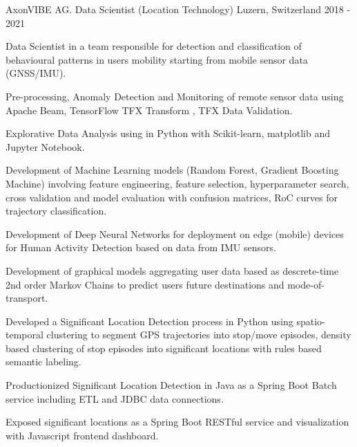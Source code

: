 

\begin{cventries}

  \cventry
    {AxonVIBE AG.} %
    {Data Scientist (Location Technology)} %
    {Luzern, Switzerland} %
    {2018 - 2021} %
    {
      \begin{cvitems} %
        \item {
            Data Scientist in a team responsible for detection and classification 
            of behavioural patterns in users mobility starting from mobile sensor data (GNSS/IMU).}
        \item {
            Pre-processing, Anomaly Detection and Monitoring of remote sensor data 
            using Apache Beam, TensorFlow TFX Transform , TFX Data Validation.}
        \item {
            Explorative Data Analysis using in Python with Scikit-learn, matplotlib and Jupyter Notebook.}
        \item {
            Development of Machine Learning models (Random Forest, Gradient 
            Boosting Machine) involving feature engineering, feature selection, hyperparameter search, cross validation 
            and model evaluation with confusion matrices, RoC curves for trajectory classification.}
        \item {
            Development of Deep Neural Networks for deployment on edge (mobile) devices for
            Human Activity Detection based on data from IMU sensors.}
        \item {
            Development of graphical models aggregating user data based as descrete-time
            2nd order Markov Chains to predict users future destinations and mode-of-transport.}
        \item {
            Developed a Significant Location Detection process in Python using spatio-temporal clustering to 
            segment GPS trajectories into stop/move episodes, density based clustering of 
            stop episodes into significant locations with rules based semantic labeling.}
        \item {
            Productionized Significant Location Detection in Java as a 
            Spring Boot Batch service including ETL and JDBC data connections.}
        \item {
            Exposed significant locations as a Spring Boot RESTful service and 
            visualization with Javascript frontend dashboard.}
      \end{cvitems}
    }


\end{cventries}
